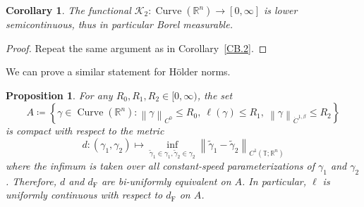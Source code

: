 \documentclass[reqno,centertags,12pt]{amsart}
\newtheorem{proposition}[theorem]{Proposition}
\newtheorem{corollary}[theorem]{Corollary}
\theoremstyle{definition}
\numberwithin{equation}{section}
\newcommand{\norm}[1]{\left\|#1\right\|}
\newcommand{\setbc}[2]{\left\{ #1\colon#2 \right\}}
\newcommand{\bbR}{{\mathbb{R}}}
\newcommand{\bbT}{{\mathbb{T}}}
\begin{document}
\begin{corollary}\label{CB.4}
    The functional $\mathcal{K}_{2}\colon\operatorname{Curve}(\bbR^{n})\to[0,\infty]$
    is lower semicontinuous, thus in particular Borel measurable.
\end{corollary}

\begin{proof}
    Repeat the same argument as in
    Corollary~\ref{CB.2}.
\end{proof}

We can prove a similar statement for H\"{o}lder norms.

\begin{proposition}\label{PB.5}
    For any $R_{0},R_{1},R_{2}\in[0,\infty)$, the set
    \[
        A\coloneqq\setbc{\gamma\in\operatorname{Curve}(\bbR^{n})}
        {\norm{\gamma}_{C^{0}} \leq R_{0},\ 
        \ell(\gamma) \leq R_{1},\ 
        \norm{\gamma}_{\dot{C}^{1,\beta}} \leq R_{2}}
    \]
    is compact with respect to the metric
    \[
        d\colon(\gamma_{1},\gamma_{2})
        \mapsto \inf_{\tilde{\gamma}_{1}\in\gamma_{1},
        \tilde{\gamma}_{2}\in\gamma_{2}}
        \norm{\tilde{\gamma}_{1} - \tilde{\gamma}_{2}}_{C^{1}(\bbT;\bbR^{n})}
    \]
    where the infimum is taken over all \emph{constant-speed parameterizations}
    of $\gamma_{1}$ and $\gamma_{2}$. Therefore, $d$ and $d_{\mathrm{F}}$ are
    bi-uniformly equivalent on $A$. In particular, $\ell$ is uniformly continuous
    with respect to $d_{\mathrm{F}}$ on $A$.
\end{proposition}
\end{document}
